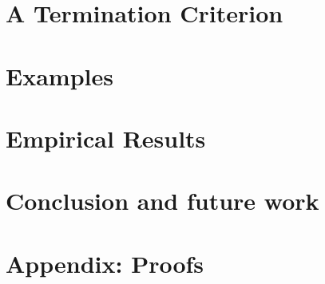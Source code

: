 
  
\section{A Termination Criterion} 
\label{antipattern:sec:termination_criterion}


\section{Examples}
\label{antipattern:sec:examples}


\section{Empirical Results}
\label{antipattern:sec:related_work} 


\section{Conclusion and future work} 
\label{antipattern:sec:conclusion}
 

\newpage
\section{Appendix: Proofs}
\label{antipattern:sec:appendix}


      